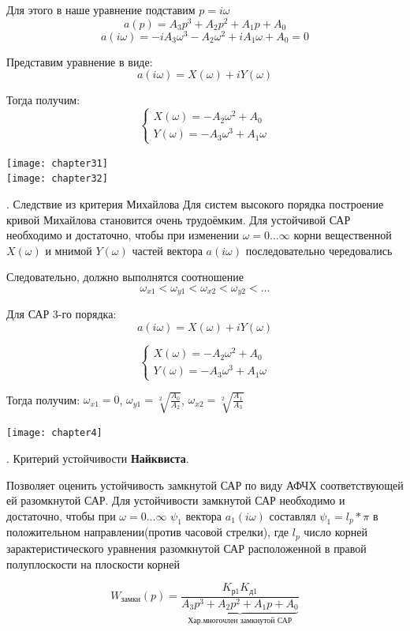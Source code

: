 \documentclass[12pt, a4paper]{report}
\begin{document}
Для этого в наше уравнение подставим $ p = i\omega$
$$ a(p) = A_{3}p^{3} + A_{2}p^{2} + A_{1}p + A_{0} $$
$$ a(i\omega) = -iA_{3}\omega^{3} - A_{2}\omega^{2} + iA_{1}\omega + A_{0} = 0 $$

Представим уравнение в виде:
$$ a(i\omega) = X(\omega) + iY(\omega) $$

Тогда получим:
$$ \begin{cases}
        X(\omega) = -A_{2}\omega^{2} + A_{0} \\
        Y(\omega) = -A_{3}\omega^{3} + A_{1}\omega
        \end{cases}
$$

\texttt{[image: chapter31]}\\
\texttt{[image: chapter32]}

. Следствие из критерия Михайлова
Для систем высокого порядка построение кривой Михайлова становится очень трудоёмким. Для устойчивой САР необходимо и достаточно, чтобы при изменении $ \omega = 0\dots\infty $ корни вещественной $ X(\omega) $ и мнимой $ Y(\omega) $ частей вектора $ a(i\omega) $ последовательно чередовались

Следовательно, должно выполнятся соотношение
$$ \omega_{x1} < \omega_{y1} < \omega_{x2} < \omega_{y2} < \dots $$

Для САР 3-го порядка:
$$ a(i\omega) = X(\omega) + iY(\omega) $$

$$ \begin{cases}
        X(\omega) = -A_{2}\omega^{2} + A_{0} \\
        Y(\omega) = -A_{3}\omega^{3} + A_{1}\omega
        \end{cases}
$$

Тогда получим:
$ \omega_{x1} = 0 $, $ \omega_{y1} = \sqrt[2]{\frac{A_{0}}{A_{2}}} $, $ \omega_{x2} = \sqrt[2]{\frac{A_{1}}{A_{3}}} $

\texttt{[image: chapter4]}

. Критерий устойчивости \textbf{Найквиста}.

Позволяет оценить устойчивость замкнутой САР по виду АФЧХ соответствующей ей разомкнутой САР.
Для устойчивости замкнутой САР необходимо и достаточно, чтобы при $ \omega=0\ldots\infty $ $ \psi_1 $ вектора $ a_{1}(i\omega) $ составлял $ \psi_{1} = l_{p} * \pi $ в положительном направлении(против часовой стрелки), где $ l_{p} $ число корней зарактеристического уравнения разомкнутой САР расположенной в правой полуплоскости на плоскости корней

$$ W_{замкн}(p) = \frac{K_{р1}K_{д1}}{\underbrace{A_{3}p^{3} + A_{2}p^{2} + A_{1}p + A_{0}}_{\text{Хар.многочлен замкнутой САР}}} $$
\end{document}
